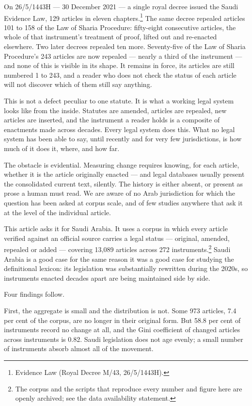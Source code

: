 \documentclass[11pt]{article}
\begin{document}
On 26/5/1443H --- 30 December 2021 --- a single royal decree issued the Saudi
Evidence Law, 129 articles in eleven chapters.\footnote{Evidence Law (Royal
Decree M/43, 26/5/1443H).} The same decree repealed articles 101 to 158 of the
Law of Sharia Procedure: fifty-eight consecutive articles, the whole of that
instrument's treatment of proof, lifted out and re-enacted elsewhere. Two
later decrees repealed ten more. Seventy-five of the Law of Sharia Procedure's
243 articles are now repealed --- nearly a third of the instrument --- and
none of this is visible in its shape. It remains in force, its articles are
still numbered 1 to 243, and a reader who does not check the status of each
article will not discover which of them still say anything.

This is not a defect peculiar to one statute. It is what a working legal
system looks like from the inside. Statutes are amended, articles are
repealed, new articles are inserted, and the instrument a reader holds is a
composite of enactments made across decades. Every legal system does this.
What no legal system has been able to say, until recently and for very few
jurisdictions, is how much of it does it, where, and how far.

The obstacle is evidential. Measuring change requires knowing, for each
article, whether it is the article originally enacted --- and legal databases
usually present the consolidated current text, silently. The history is
either absent, or present as prose a human must read. We are aware of no Arab
jurisdiction for which the question has been asked at corpus scale, and of few
studies anywhere that ask it at the level of the individual article.

This article asks it for Saudi Arabia. It uses a corpus in which every article
verified against an official source carries a legal status --- original,
amended, repealed or added --- covering 13,089 articles across 272
instruments.\footnote{The corpus and the scripts that reproduce every number
and figure here are openly archived; see the data availability statement.}
Saudi Arabia is a good case for the same reason it was a good case for
studying the definitional lexicon: its legislation was substantially rewritten
during the 2020s, so instruments enacted decades apart are being maintained
side by side.

Four findings follow.

First, the aggregate is small and the distribution is not. Some 973 articles,
7.4 per cent of the corpus, are no longer in their original form. But 58.8 per
cent of instruments record no change at all, and the Gini coefficient of
changed articles across instruments is 0.82. Saudi legislation does not age
evenly; a small number of instruments absorb almost all of the movement.
\end{document}

